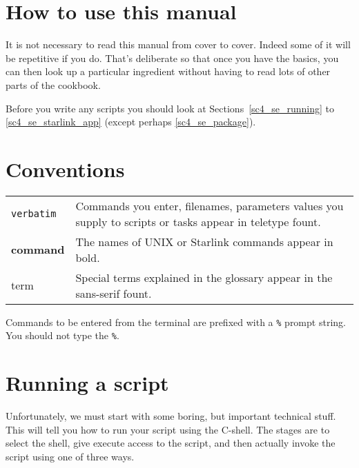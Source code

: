 \documentclass[twoside,11pt]{article}
\newcommand{\htmlref}[2]{#1}
\newcommand{\xlabel}[1]{}
\newcommand{\latexelsehtml}[2]{#1}
\newcommand{\latexelsehtml}[2]{#2}
\begin{document}
\newpage

\section{How to use this manual}

It is not necessary to read this manual from cover to cover.  Indeed
some of it will be repetitive if you do.  That's deliberate so that
once you have the basics, you can then look up a particular ingredient
without having to read lots of other parts of the cookbook.

Before you write any scripts you should look at
\latexelsehtml{Sections~\ref{sc4_se_running} to \ref{sc4_se_starlink_app}
(except perhaps \ref{sc4_se_package})}{\htmlref{Running a
script}{sc4_se_running}, \htmlref{Some simple examples}{sc4_se_simple},
\htmlref{Shell Variables}{sc4_se_variables}, and
\htmlref{Executing a Starlink Application}{sc4_se_starlink_app}}.

\section{Conventions}
\begin{tabular}{lp{120mm}}
{\tt verbatim}   &  Commands you enter, filenames, parameters values
                    you supply to scripts or tasks appear in teletype
                    fount. \\
{\bf command}    &  The names of UNIX or Starlink commands appear
                    in bold. \\
{\sf term}       &  Special terms explained in the glossary appear
                    in the sans-serif fount. \\
\end{tabular}

Commands to be entered from the terminal are prefixed with a {\tt \%}
prompt string.  You should not type the {\tt \%}.

\newpage
\section{\xlabel{sc4_se_running}Running a script\label{sc4_se_running}}

Unfortunately, we must start with some boring, but important technical
stuff.  This will tell you how to run your script using the C-shell.  The
stages are to select the shell, give execute access to the script, and
then actually invoke the script using one of three ways.
\end{document}
